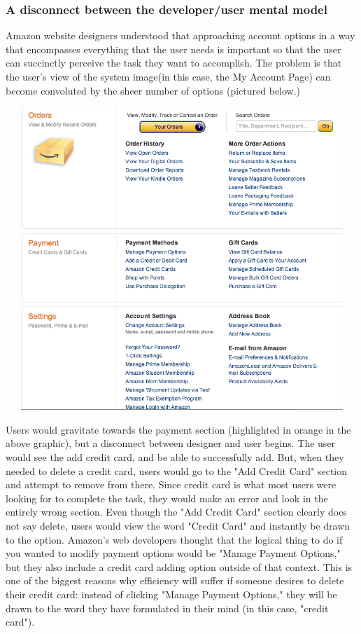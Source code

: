 \documentclass[11pt, oneside]{article}   	%
\begin{document}
\subsubsection{A disconnect between the developer/user mental model}
Amazon website designers understood that approaching account options in a way that encompasses everything that the user needs is important so that the user can succinctly perceive the task they want to accomplish. The problem is that the user's view of the system image(in this case, the My Account Page) can become convoluted by the sheer number of options (pictured below.)

\includegraphics[width=6in, height=4.5in]{Amazon2}

Users would gravitate towards the payment section (highlighted in orange in the above graphic), but a disconnect between designer and user begins. The user would see the add credit card, and be able to successfully add. But, when they needed to delete a credit card, users would go to the "Add Credit Card" section and attempt to remove from there. Since credit card is what most users were looking for to complete the task, they would make an error and look in the entirely wrong section. Even though the "Add Credit Card" section clearly does not say delete, users would view the word "Credit Card" and instantly be drawn to the option. Amazon's web developers thought that the logical thing to do if you wanted to modify payment options would be "Manage Payment Options," but they also include a credit card adding option outside of that context. This is one of the biggest reasons why efficiency will suffer if someone desires to delete their credit card: instead of clicking "Manage Payment Options," they will be drawn to the word they have formulated in their mind (in this case, "credit card").
\end{document}
